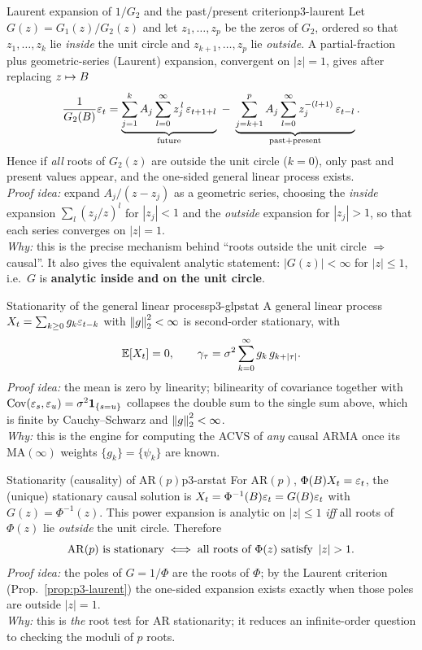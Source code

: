\begin{proposition}{Laurent expansion of $1/G_2$ and the past/present criterion}{p3-laurent}
Let $G(z)=G_1(z)/G_2(z)$ and let $z_1,\dots,z_p$ be the zeros of $G_2$, ordered
so that $z_1,\dots,z_k$ lie \emph{inside} the unit circle and
$z_{k+1},\dots,z_p$ lie \emph{outside}. A partial-fraction plus geometric-series
(Laurent) expansion, convergent on $|z|=1$, gives after replacing $z\mapsto B$
\[
\frac{1}{G_2(B)}\varepsilon_t
=\underbrace{\sum_{j=1}^{k}A_j\sum_{l=0}^{\infty}z_j^{\,l}\,\varepsilon_{t+1+l}}_{\text{future}}
\;-\;\underbrace{\sum_{j=k+1}^{p}A_j\sum_{l=0}^{\infty}z_j^{-(l+1)}\,\varepsilon_{t-l}}_{\text{past}+\text{present}} .
\]
Hence if \emph{all} roots of $G_2(z)$ are outside the unit circle ($k=0$), only
past and present values appear, and the one-sided general linear process exists.\\
\textit{Proof idea:} expand $A_j/(z-z_j)$ as a geometric series, choosing the
\emph{inside} expansion $\sum_l (z_j/z)^l$ for $|z_j|<1$ and the \emph{outside}
expansion for $|z_j|>1$, so that each series converges on $|z|=1$.\\
\textit{Why:} this is the precise mechanism behind ``roots outside the unit
circle $\Rightarrow$ causal''. It also gives the equivalent analytic statement:
$|G(z)|<\infty$ for $|z|\le1$, i.e.\ $G$ is \textbf{analytic inside and on the
unit circle}.
\end{proposition}

\begin{proposition}{Stationarity of the general linear process}{p3-glpstat}
A general linear process $X_t=\sum_{k\ge0}g_k\varepsilon_{t-k}$ with
$\left\lVert g \right\rVert_2^2<\infty$ is second-order stationary, with
\[
\mathbb{E}[X_t]=0,\qquad
\gamma_\tau=\sigma^2\sum_{k=0}^{\infty}g_k\,g_{k+\left\lvert \tau \right\rvert}.
\]
\textit{Proof idea:} the mean is zero by linearity; bilinearity of covariance
together with $\operatorname{Cov}(\varepsilon_s,\varepsilon_u)=\sigma^2\mathbf{1}_{\{s=u\}}$ collapses the double
sum to the single sum above, which is finite by Cauchy--Schwarz and
$\left\lVert g \right\rVert_2^2<\infty$.\\
\textit{Why:} this is the engine for computing the ACVS of \emph{any} causal
ARMA once its $\mathrm{MA}(\infty)$ weights $\{g_k\}=\{\psi_k\}$ are known.
\end{proposition}

\begin{proposition}{Stationarity (causality) of $\mathrm{AR}(p)$}{p3-arstat}
For $\mathrm{AR}(p)$, $\Phi(B)X_t=\varepsilon_t$, the (unique) stationary causal
solution is $X_t=\Phi^{-1}(B)\varepsilon_t=G(B)\varepsilon_t$ with
$G(z)=\Phi^{-1}(z)$. This power expansion is analytic on $|z|\le1$
\emph{iff} all roots of $\Phi(z)$ lie \emph{outside} the unit circle. Therefore
\[
\mathrm{AR}(p)\ \text{is stationary}\iff \text{all roots of }\Phi(z)\ \text{satisfy }\left\lvert z \right\rvert>1 .
\]
\textit{Proof idea:} the poles of $G=1/\Phi$ are the roots of $\Phi$; by the
Laurent criterion (Prop.~\ref{prop:p3-laurent}) the one-sided expansion exists
exactly when those poles are outside $|z|=1$.\\
\textit{Why:} this is \emph{the} root test for AR stationarity; it reduces an
infinite-order question to checking the moduli of $p$ roots.
\end{proposition}

